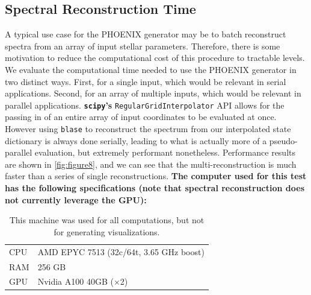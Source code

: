 \documentclass[twocolumn, linenumbers]{aastex631}
\begin{document}
\subsection{Spectral Reconstruction Time}
A typical use case for the PHOENIX generator may be to batch reconstruct spectra from an array of input stellar parameters.
Therefore, there is some motivation to reduce the computational cost of this procedure to tractable levels.
We evaluate the computational time needed to use the PHOENIX generator in two distinct ways.
First, for a single input, which would be relevant in serial applications.
Second, for an array of multiple inputs, which would be relevant in parallel applications.
\textbf{\texttt{scipy}'s} \texttt{RegularGridInterpolator} API allows for the passing in of an entire array of input coordinates to be evaluated at once.
However using \texttt{blase} to reconstruct the spectrum from our interpolated state dictionary is always done serially, leading to what is actually more of a pseudo-parallel evaluation, but extremely performant nonetheless.
Performance results are shown in \autoref{fig:figure8}, and we can see that the multi-reconstruction is much faster than a series of single reconstructions.
\textbf{The computer used for this test has the following specifications (note that spectral reconstruction does not currently leverage the GPU):}
\begin{table}[h!]
    \centering
    \begin{tabular}{ll}
        \hline
        CPU & AMD EPYC 7513 (32c/64t, 3.65 GHz boost)\\
        RAM & 256 GB\\
        GPU & Nvidia A100 40GB ($\times$2)\\
        \hline
    \end{tabular}
    \caption{This machine was used for all computations, but not for generating visualizations.}
\end{table}
\end{document}
